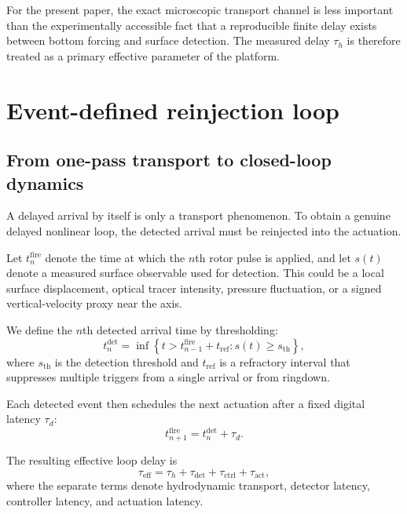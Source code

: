 \documentclass[11pt,a4paper]{article}
\begin{document}
For the present paper, the exact microscopic transport channel is less important than the experimentally accessible fact that a reproducible finite delay exists between bottom forcing and surface detection. The measured delay $\tau_h$ is therefore treated as a primary effective parameter of the platform.

\section{Event-defined reinjection loop}

\subsection{From one-pass transport to closed-loop dynamics}

A delayed arrival by itself is only a transport phenomenon. To obtain a genuine delayed nonlinear loop, the detected arrival must be reinjected into the actuation.

Let $t_n^{\mathrm{fire}}$ denote the time at which the $n$th rotor pulse is applied, and let $s(t)$ denote a measured surface observable used for detection. This could be a local surface displacement, optical tracer intensity, pressure fluctuation, or a signed vertical-velocity proxy near the axis.

We define the $n$th detected arrival time by thresholding:
\begin{equation}
t_n^{\mathrm{det}}
=
\inf\left\{
t>t_{n-1}^{\mathrm{fire}}+t_{\mathrm{ref}}
:
s(t)\ge s_{\mathrm{th}}
\right\},
\label{eq:t_detect}
\end{equation}
where $s_{\mathrm{th}}$ is the detection threshold and $t_{\mathrm{ref}}$ is a refractory interval that suppresses multiple triggers from a single arrival or from ringdown.

Each detected event then schedules the next actuation after a fixed digital latency $\tau_d$:
\begin{equation}
t_{n+1}^{\mathrm{fire}} = t_n^{\mathrm{det}} + \tau_d.
\label{eq:t_fire}
\end{equation}

The resulting effective loop delay is
\begin{equation}
\tau_{\mathrm{eff}}
=
\tau_h + \tau_{\mathrm{det}} + \tau_{\mathrm{ctrl}} + \tau_{\mathrm{act}},
\label{eq:tau_eff}
\end{equation}
where the separate terms denote hydrodynamic transport, detector latency, controller latency, and actuation latency.
\end{document}
